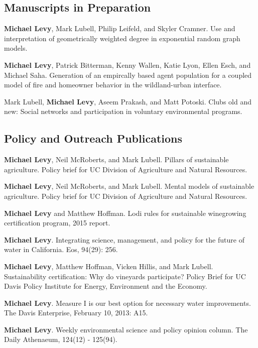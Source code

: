 \subsection{Manuscripts in
Preparation}\label{manuscripts-in-preparation}

\begin{description}
\tightlist
\item[\phantom{2016}]
\textbf{Michael Levy}, Mark Lubell, Philip Leifeld, and Skyler Cramner.
Use and interpretation of geometrically weighted degree in exponential
random graph models.
\item[\phantom{2016}]
\textbf{Michael Levy}, Patrick Bitterman, Kenny Wallen, Katie Lyon,
Ellen Esch, and Michael Saha. Generation of an empircally based agent
population for a coupled model of fire and homeowner behavior in the
wildland-urban interface.
\item[\phantom{2016}]
Mark Lubell, \textbf{Michael Levy}, Aseem Prakash, and Matt Potoski.
Clubs old and new: Social networks and participation in voluntary
environmental programs.
\end{description}

\subsection{Policy and Outreach
Publications}\label{policy-and-outreach-publications}

\begin{description}
\tightlist
\item[2016]
\textbf{Michael Levy}, Neil McRoberts, and Mark Lubell. Pillars of
sustainable agriculture. Policy brief for UC Division of Agriculture and
Natural Resources.
\item[2016]
\textbf{Michael Levy}, Neil McRoberts, and Mark Lubell. Mental models of
sustainable agriculture. Policy brief for UC Division of Agriculture and
Natural Resources.
\item[2015]
\textbf{Michael Levy} and Matthew Hoffman. Lodi rules for sustainable
winegrowing certification program, 2015 report.
\item[2013]
\textbf{Michael Levy}. Integrating science, management, and policy for
the future of water in California. Eos, 94(29): 256.
\item[2013]
\textbf{Michael Levy}, Matthew Hoffman, Vicken Hillis, and Mark Lubell.
Sustainability certification: Why do vineyards participate? Policy Brief
for UC Davis Policy Institute for Energy, Environment and the Economy.
\item[2013]
\textbf{Michael Levy}. Measure I is our best option for necessary water
improvements. The Davis Enterprise, February 10, 2013: A15.
\item[2010 - 2012]
\textbf{Michael Levy}. Weekly environmental science and policy opinion
column. The Daily Athenaeum, 124(12) - 125(94).
\end{description}

